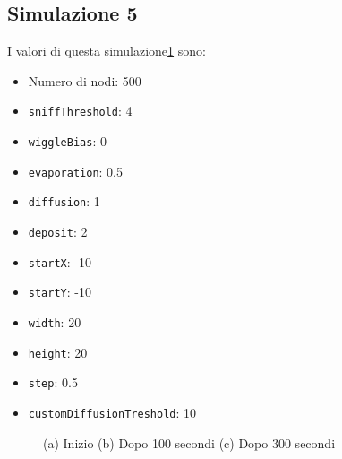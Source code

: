 \subsection{Simulazione 5}\label{sim5}
I valori di questa simulazione\space \cref{fig:sim5} sono:
\begin{itemize}
    \item Numero di nodi: 500
    \item \texttt{sniffThreshold}: 4
    \item \texttt{wiggleBias}: 0
    \item \texttt{evaporation}: 0.5
    \item \texttt{diffusion}: 1
    \item \texttt{deposit}: 2
    \item \texttt{startX}: -10
    \item \texttt{startY}: -10
    \item \texttt{width}: 20
    \item \texttt{height}: 20
    \item \texttt{step}: 0.5
    \item \texttt{customDiffusionTreshold}: 10
\end{itemize}
\begin{figure}[p]
    \centering
    \caption{(a) Inizio (b) Dopo 100 secondi (c) Dopo 300 secondi}\label{fig:sim5}
\end{figure}

